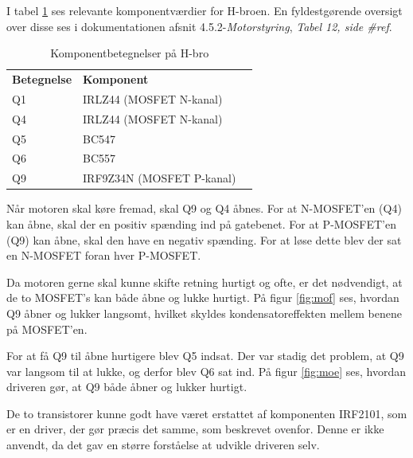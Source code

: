 I tabel \ref{hbrotabel} ses relevante komponentværdier for H-broen. En fyldestgørende oversigt over disse ses i dokumentationen afsnit 4.5.2-\textit{Motorstyring}, \textit{Tabel 12, side \#ref}.

\begin{table}[H]
	\centering
	\begin{tabular}{|l|l|l}
		\cline{1-2}
		\textbf{Betegnelse} & \textbf{Komponent}  	    &  \\ \cline{1-2}
		Q1   				& IRLZ44 (MOSFET N-kanal)  	&  \\ \cline{1-2}
		Q4   				& IRLZ44 (MOSFET N-kanal)	&  \\ \cline{1-2}
		Q5   				& BC547                     &  \\ \cline{1-2}
		Q6   				& BC557                     &  \\ \cline{1-2}
		Q9   				& IRF9Z34N (MOSFET P-kanal)	&  \\ \cline{1-2}
	\end{tabular}
	\caption{Komponentbetegnelser på H-bro}
	\label{hbrotabel}
\end{table}

\noindent Når motoren skal køre fremad, skal Q9 og Q4 åbnes. For at N-MOSFET'en (Q4) kan åbne, skal der en positiv spænding ind på gatebenet. For at P-MOSFET'en (Q9) kan åbne, skal den have en negativ spænding. For at løse dette blev der sat en N-MOSFET foran hver P-MOSFET. \newline

\noindent Da motoren gerne skal kunne skifte retning hurtigt og ofte, er det nødvendigt, at de to MOSFET's kan både åbne og lukke hurtigt. På figur \ref{fig:mof} ses, hvordan Q9 åbner og lukker langsomt, hvilket skyldes kondensatoreffekten mellem benene på MOSFET'en. \newline

\noindent For at få Q9 til åbne hurtigere blev Q5 indsat. Der var stadig det problem, at Q9 var langsom til at lukke, og derfor blev Q6 sat ind. På figur \ref{fig:moe} ses, hvordan driveren gør, at Q9 både åbner og lukker hurtigt. \newline 

\noindent De to transistorer kunne godt have været erstattet af komponenten IRF2101, som er en driver, der gør præcis det samme, som beskrevet ovenfor. Denne er ikke anvendt, da det gav en større forståelse at udvikle driveren selv. \newline 

